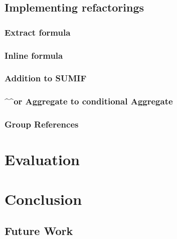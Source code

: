 \documentclass[12pt,a4paper,onecolumn,oneside]{memoir}
\begin{document}
\section{Implementing refactorings}

\subsection{Extract formula}

\subsection{Inline formula}

\subsection{Addition to SUMIF}

\subsection{\textasciicircum\textasciicircum or Aggregate to conditional Aggregate}

\subsection{Group References}

\chapter{Evaluation}


\chapter{Conclusion}

\section{Future Work}



\end{document}

